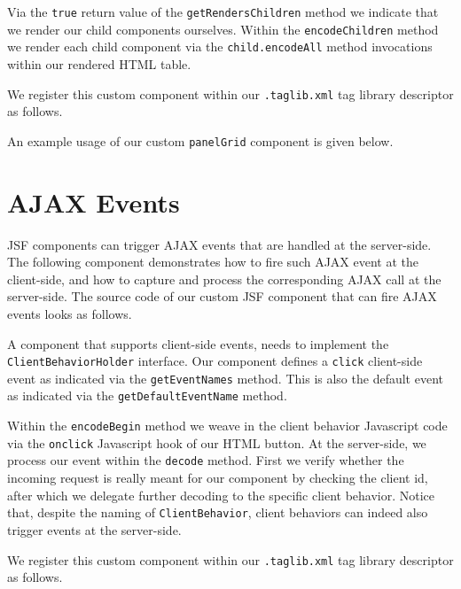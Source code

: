 Via the \texttt{true} return value of the \texttt{getRendersChildren} method we indicate that we render our child components ourselves.
Within the \texttt{encodeChildren} method we render each child component via the \texttt{child.encodeAll} method invocations within our rendered HTML table.

We register this custom component within our \texttt{.taglib.xml} tag library descriptor as follows.


An example usage of our custom \texttt{panelGrid} component is given below.



\section{AJAX Events}
JSF components can trigger AJAX events that are handled at the server-side.
The following component demonstrates how to fire such AJAX event at the client-side, and how to capture and process the corresponding AJAX call at the server-side.
The source code of our custom JSF component that can fire AJAX events looks as follows.

A component that supports client-side events, needs to implement the \texttt{ClientBehavior\allowbreak Holder} interface.
Our component defines a \texttt{click} client-side event as indicated via the \texttt{getEvent\allowbreak  Names} method.
This is also the default event as indicated via the \texttt{getDefault\allowbreak EventName} method.

Within the \texttt{encodeBegin} method we weave in the client behavior Javascript code via the \texttt{onclick} Javascript hook of our HTML button.
At the server-side, we process our event within the \texttt{decode} method.
First we verify whether the incoming request is really meant for our component by checking the client id, after which we delegate further decoding to the specific client behavior.
Notice that, despite the naming of \texttt{ClientBehavior}, client behaviors can indeed also trigger events at the server-side.

We register this custom component within our \texttt{.taglib.xml} tag library descriptor as follows.



